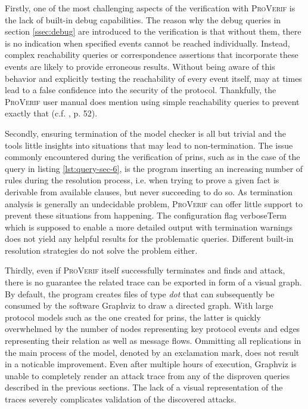 Firstly, one of the most challenging aspects of the verification with \textsc{ProVerif} is the lack of built-in debug capabilities.
The reason why the debug queries in section \ref{ssec:debug} are introduced to the verification is that without them, there is no indication when specified events cannot be reached individually.
Instead, complex reachability queries or correspondence assertions that incorporate these events are likely to provide erroneous results.
Without being aware of this behavior and explicitly testing the reachability of every event itself, may at times lead to a false confidence into the security of the protocol.
Thankfully, the \textsc{ProVerif} user manual does mention using simple reachability queries to prevent exactly that (c.f. \cite{blanchet2020proverif}, p. 52).

Secondly, ensuring termination of the model checker is all but trivial and the tools little insights into situations that may lead to non-termination.
The issue commonly encountered during the verification of \gls{prins}, such as in the case of the query in listing \ref{lst:query-sec-6}, is the program inserting an increasing number of rules during the resolution process, i.e. when trying to prove a given fact is derivable from available clauses, but never succeeding to do so.
As termination analysis is generally an undecidable problem, \textsc{ProVerif} can offer little support to prevent these situations from happening.
The configuration flag {\sffamily verboseTerm} which is supposed to enable a more detailed output with termination warnings does not yield any helpful results for the problematic queries.
Different built-in resolution strategies do not solve the problem either.

Thirdly, even if \textsc{ProVerif} itself successfully terminates and finds and attack, there is no guarantee the related trace can be exported in form of a visual graph.
By default, the program creates files of type \textit{dot} that can subsequently be consumed by the software Graphviz to draw a directed graph.
With large protocol models such as the one created for \gls{prins}, the latter is quickly overwhelmed by the number of nodes representing key protocol events and edges representing their relation as well as message flows.
Ommitting all replications in the main process of the model, denoted by an exclamation mark, does not result in a noticable improvement.
Even after multiple hours of execution, Graphviz is unable to completely render an attack trace from any of the disproven queries described in the previous sections.
The lack of a visual representation of the traces severely complicates validation of the discovered attacks.


